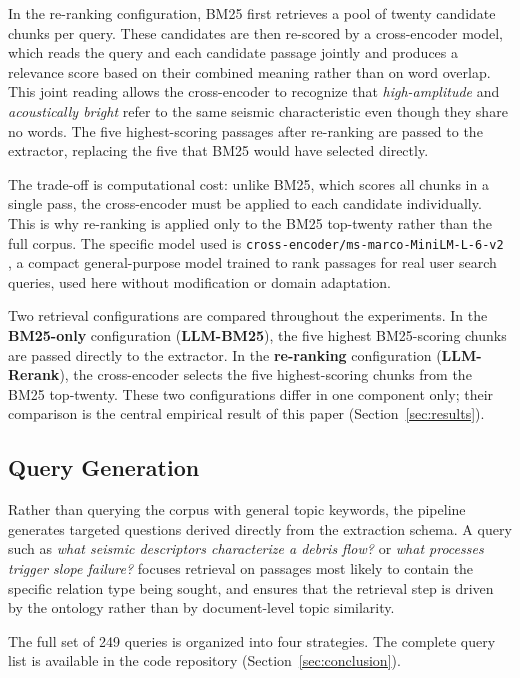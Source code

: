 \documentclass[10pt]{article}
\begin{document}
In the re-ranking configuration, BM25 first retrieves a
pool of twenty candidate chunks per query.
These candidates are then re-scored by a cross-encoder
model, which reads the query and each candidate passage
jointly and produces a relevance score based on their
combined meaning rather than on word overlap.
This joint reading allows the cross-encoder to recognize
that \emph{high-amplitude} and \emph{acoustically bright}
refer to the same seismic characteristic even though they
share no words.
The five highest-scoring passages after re-ranking are
passed to the extractor, replacing the five that BM25 would
have selected directly.

The trade-off is computational cost: unlike BM25, which
scores all chunks in a single pass, the cross-encoder must
be applied to each candidate individually.
This is why re-ranking is applied only to the BM25
top-twenty rather than the full corpus.
The specific model used is
\texttt{cross-encoder/ms-marco-MiniLM-L-6-v2}
\citep{bajaj2016ms}, a compact general-purpose model trained
to rank passages for real user search queries, used here
without modification or domain adaptation.

Two retrieval configurations are compared throughout the
experiments.
In the \textbf{BM25-only} configuration (\textbf{LLM-BM25}), the five
highest BM25-scoring chunks are passed directly to the
extractor.
In the \textbf{re-ranking} configuration (\textbf{LLM-Rerank}), the
cross-encoder selects the five highest-scoring chunks from
the BM25 top-twenty.
These two configurations differ in one component only;
their comparison is the central empirical result of this
paper (Section~\ref{sec:results}).

\subsection{Query Generation}
\label{sec:queries}

Rather than querying the corpus with general topic keywords,
the pipeline generates targeted questions derived directly
from the extraction schema.
A query such as \emph{what seismic descriptors characterize
a debris flow?} or \emph{what processes trigger slope
failure?} focuses retrieval on passages most likely to
contain the specific relation type being sought, and ensures
that the retrieval step is driven by the ontology rather than
by document-level topic similarity.

The full set of 249 queries is organized into four
strategies.
The complete query list is available in the code repository
(Section~\ref{sec:conclusion}).
\end{document}
